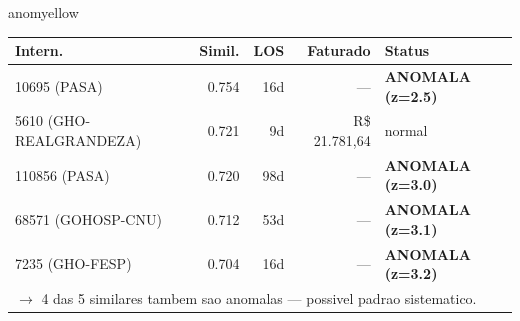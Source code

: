 \documentclass[a4paper,10pt]{article}
\begin{document}
\begin{anomalycard}[Internacao 24484 | GHO-PETROBRAS | MODERADO (z=2.25)]{anomyellow}
\begin{tabular}{l r r r l}\toprule\textbf{Intern.} & \textbf{Simil.} & \textbf{LOS} & \textbf{Faturado} & \textbf{Status} \\\midrule
10695 (PASA) & 0.754 & 16d & --- & \textcolor{anomred}{\textbf{ANOMALA (z=2.5)}} \\
5610 (GHO-REALGRANDEZA) & 0.721 & 9d & R\$ 21.781,64 & \textcolor{jcubeblue}{normal} \\
110856 (PASA) & 0.720 & 98d & --- & \textcolor{anomred}{\textbf{ANOMALA (z=3.0)}} \\
68571 (GOHOSP-CNU) & 0.712 & 53d & --- & \textcolor{anomred}{\textbf{ANOMALA (z=3.1)}} \\
7235 (GHO-FESP) & 0.704 & 16d & --- & \textcolor{anomred}{\textbf{ANOMALA (z=3.2)}} \\
\multicolumn{5}{l}{\textcolor{anomred}{\small $\rightarrow$ 4 das 5 similares tambem sao anomalas --- possivel padrao sistematico.}} \\
\bottomrule\end{tabular}


\end{anomalycard}

\newpage
\end{document}
